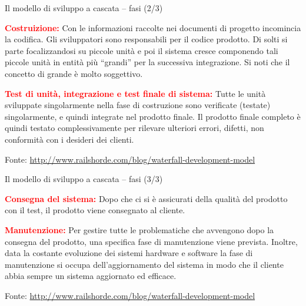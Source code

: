 \documentclass{beamer}
\begin{document}
\begin{frame}{\centerline{Il modello di sviluppo a cascata -- fasi (2/3)}}

\textcolor{red}{\bf Costruizione:} Con le informazioni raccolte nei documenti di progetto incomincia la codifica. Gli sviluppatori sono responsabili per il codice prodotto. Di solti si parte focalizzandosi su piccole unit\`{a} e poi il sistema cresce componendo tali piccole unit\`{a} in entit\`{a} pi\`{u} ``grandi'' per la successiva integrazione. Si noti che il concetto di grande \`{e} molto soggettivo.
\newline

\textcolor{red}{\bf Test di unit\`{a}, integrazione e test finale di sistema:} Tutte le unit\`{a} sviluppate singolarmente nella fase di costruzione sono verificate (testate) singolarmente, e quindi integrate nel prodotto finale. Il prodotto finale completo \`{e} quindi testato complessivamente per rilevare ulteriori errori, difetti, non conformit\`{a} con i desideri dei clienti.
\newline

\begin{center}
\tiny
Fonte: \url{http://www.railshorde.com/blog/waterfall-development-model}
\end{center}


\end{frame}

\begin{frame}{\centerline{Il modello di sviluppo a cascata -- fasi (3/3)}}



\textcolor{red}{\bf Consegna del sistema:} Dopo che ci si \`{e} assicurati della qualit\`{a} del prodotto con il test, il prodotto viene consegnato al cliente.
\newline

\textcolor{red}{\bf Manutenzione:} Per gestire tutte le problematiche che avvengono dopo la consegna del prodotto, una specifica fase di manutenzione viene prevista. Inoltre, data la costante evoluzione dei sistemi hardware e software la fase di manutenzione si occupa dell'aggiornamento del sistema in modo che il cliente abbia sempre un sistema aggiornato ed efficace.

\newline

\begin{center}
\tiny
Fonte: \url{http://www.railshorde.com/blog/waterfall-development-model}
\end{center}

\end{frame}
\end{document}
